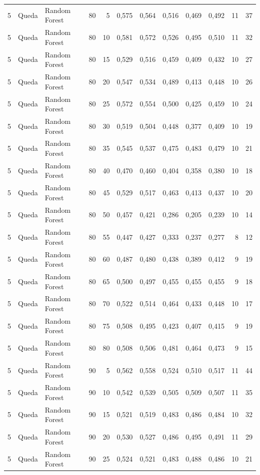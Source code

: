 \begin{longtable}{@{}rllrrrrrrrrr@{}}
5 & Queda & Random Forest & 80 & 5 & 0,575 & 0,564 & 0,516 & 0,469 & 0,492 & 11 & 37 \\
5 & Queda & Random Forest & 80 & 10 & 0,581 & 0,572 & 0,526 & 0,495 & 0,510 & 11 & 32 \\
5 & Queda & Random Forest & 80 & 15 & 0,529 & 0,516 & 0,459 & 0,409 & 0,432 & 10 & 27 \\
5 & Queda & Random Forest & 80 & 20 & 0,547 & 0,534 & 0,489 & 0,413 & 0,448 & 10 & 26 \\
5 & Queda & Random Forest & 80 & 25 & 0,572 & 0,554 & 0,500 & 0,425 & 0,459 & 10 & 24 \\
5 & Queda & Random Forest & 80 & 30 & 0,519 & 0,504 & 0,448 & 0,377 & 0,409 & 10 & 19 \\
5 & Queda & Random Forest & 80 & 35 & 0,545 & 0,537 & 0,475 & 0,483 & 0,479 & 10 & 21 \\
5 & Queda & Random Forest & 80 & 40 & 0,470 & 0,460 & 0,404 & 0,358 & 0,380 & 10 & 18 \\
5 & Queda & Random Forest & 80 & 45 & 0,529 & 0,517 & 0,463 & 0,413 & 0,437 & 10 & 20 \\
5 & Queda & Random Forest & 80 & 50 & 0,457 & 0,421 & 0,286 & 0,205 & 0,239 & 10 & 14 \\
5 & Queda & Random Forest & 80 & 55 & 0,447 & 0,427 & 0,333 & 0,237 & 0,277 & 8 & 12 \\
5 & Queda & Random Forest & 80 & 60 & 0,487 & 0,480 & 0,438 & 0,389 & 0,412 & 9 & 19 \\
5 & Queda & Random Forest & 80 & 65 & 0,500 & 0,497 & 0,455 & 0,455 & 0,455 & 9 & 18 \\
5 & Queda & Random Forest & 80 & 70 & 0,522 & 0,514 & 0,464 & 0,433 & 0,448 & 10 & 17 \\
5 & Queda & Random Forest & 80 & 75 & 0,508 & 0,495 & 0,423 & 0,407 & 0,415 & 9 & 19 \\
5 & Queda & Random Forest & 80 & 80 & 0,508 & 0,506 & 0,481 & 0,464 & 0,473 & 9 & 15 \\
5 & Queda & Random Forest & 90 & 5 & 0,562 & 0,558 & 0,524 & 0,510 & 0,517 & 11 & 44 \\
5 & Queda & Random Forest & 90 & 10 & 0,542 & 0,539 & 0,505 & 0,509 & 0,507 & 11 & 35 \\
5 & Queda & Random Forest & 90 & 15 & 0,521 & 0,519 & 0,483 & 0,486 & 0,484 & 10 & 32 \\
5 & Queda & Random Forest & 90 & 20 & 0,530 & 0,527 & 0,486 & 0,495 & 0,491 & 11 & 29 \\
5 & Queda & Random Forest & 90 & 25 & 0,524 & 0,521 & 0,483 & 0,488 & 0,486 & 10 & 21 \\

\end{longtable}
